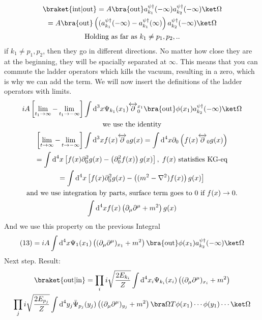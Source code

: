 \documentclass[]{scrartcl}
\begin{document}
\begin{gather}
	\braket{\text{int}|\text{out}} = A\bra{\text{out}}a_{k_1}^{\psi\dagger}(-\infty)a_{k_2}^{\psi\dagger}(-\infty)\ket\Omega\\
	= A\bra{\text{out}}\left((a_{k_1}^{\psi\dagger}(-\infty) - a_{k_1}^{\psi\dagger}(\infty)\right) a_{k_2}^{\psi\dagger}(-\infty) \ket\Omega\\
	\text{Holding as far as $k_1 \neq p_1,p_2,..$}
\end{gather}
if $k_1 \neq p_1,p_2$, then they go in different directions. No matter how close they are at the beginning, they will be spacially separated at $\infty$. This means that you can commute the ladder operators which kills the vacuum, resulting in a zero, which is why we can add the term. We will now insert the definitions of the ladder operators with limits.
\begin{gather}
	iA \left[\lim_{t_1 \rightarrow \infty} - \lim_{t_1\rightarrow -\infty}\right] \int\text d^3x \Psi_{k_1}(x_1)\overleftrightarrow\partial_0^{x_1}\bra{\text{out}} \phi(x_1)a_{k_2}^{\psi\dagger}(-\infty)\ket\Omega\\
	\text{we use the identity}\nonumber\\
	\left[\lim_{t\rightarrow\infty} - \lim_{t\rightarrow-\infty}\right] \int\text d^3x f(x)\overleftrightarrow\partial_0 g(x) = \int\text d^4x\partial_0\left(f(x)\overleftrightarrow\partial_0 g(x)\right)\\
	= \int\text{d}^4x \left[f(x)\partial_0^2g(x) - \left(\partial_0^2 f(x)\right) g(x)\right],\;\text{$f(x)$ statisfies KG-eq}\\
	= \int\text d^4x \left[f(x)\partial_0^2g(x) - \left((m^2 - \nabla^2)f(x)\right)g(x)\right]\\
	\text{and we use integration by parts, surface term goes to 0 if $f(x)\rightarrow0$.}\nonumber\\
	\int\text d^4x f(x)\left(\partial_\mu\partial^\mu + m^2\right)g(x)
\end{gather}
And we use this property on the previous Integral
\begin{gather}
	(13) = iA\int\text d^4x \Psi_1(x_1)\left((\partial_\mu\partial^\mu)_{x_1}+m^2\right)\bra{\text{out}}\phi(x_1) a_{k_2}^{\psi\dagger}(-\infty)\ket\Omega
\end{gather}
Next step. Result:
\begin{gather}
	\braket{\text{out}|\text{in}} = \prod_i i\sqrt{\frac{2E_{k_i}}{Z}}\int \text d^4x_i \Psi_{k_i}(x_i) \left((\partial_\mu\partial^\mu)_{x_i} + m^2\right)\nonumber\\
\prod_j i\sqrt{\frac{2E_{p_j}}{Z}}\int \text d^4y_j \bar\Psi_{p_j}(y_j)\left((\partial_\mu\partial^\mu)_{y_j} + m^2\right) \bra\Omega T\phi(x_1)\cdots\phi(y_1)\cdots\ket\Omega
\end{gather}
\end{document}
